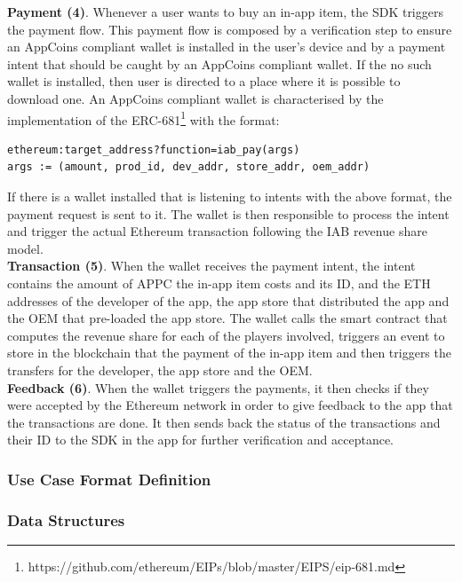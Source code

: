 \vspace{0.2cm} \noindent \textbf{Payment (4)}. Whenever a user wants to buy an in-app item, the SDK triggers the payment flow. This payment flow is composed by a verification step to ensure an AppCoins compliant wallet is installed in the user's device and by a payment intent that should be caught by an AppCoins compliant wallet. If the no such wallet is installed, then user is directed to a place where it is possible to download one. An AppCoins compliant wallet is characterised by the implementation of the ERC-681\footnote{https://github.com/ethereum/EIPs/blob/master/EIPS/eip-681.md} with the format:
\begin{lstlisting}
ethereum:target_address?function=iab_pay(args)
args := (amount, prod_id, dev_addr, store_addr, oem_addr)
\end{lstlisting}

If there is a wallet installed that is listening to intents with the above format, the payment request is sent to it. The wallet is then responsible to process the intent and trigger the actual Ethereum transaction following the IAB revenue share model. \\

\noindent \textbf{Transaction (5)}. When the wallet receives the payment intent, the intent contains the amount of APPC the in-app item costs and its ID, and the ETH addresses of the developer of the app, the app store that distributed the app and the OEM that pre-loaded the app store. The wallet calls the smart contract that computes the revenue share for each of the players involved, triggers an event to store in the blockchain that the payment of the in-app item and then triggers the transfers for the developer, the app store and the OEM. \\

\noindent \textbf{Feedback (6)}. When the wallet triggers the payments, it then checks if they were accepted by the Ethereum network in order to give feedback to the app that the transactions are done. It then sends back the status of the transactions and their ID to the SDK in the app for further verification and acceptance.

\subsubsection{Use Case Format Definition}
\label{sssec:iab_fd}

\subsubsection{Data Structures}

